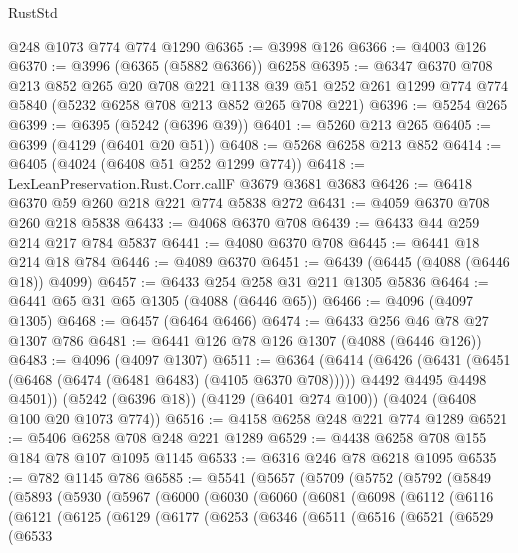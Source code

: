 \begin{lexlean}{RustStd}
\begin{coremodule}
{\begin{coremodule}
{{{{{{{{{{{{{{    @248
    @1073
    @774
    @774
    @1290
@6365 := @3998 @126
@6366 := @4003 @126
@6370 := @3996 (@6365 (@5882 @6366)) @6258
@6395 := @6347
    @6370
    @708
    @213
    @852
    @265
    @20
    @708
    @221
    @1138
    @39
    @51
    @252
    @261
    @1299
    @774
    @774
    @5840
    (@5232 @6258 @708 @213 @852 @265 @708 @221)
@6396 := @5254 @265
@6399 := @6395 (@5242 (@6396 @39))
@6401 := @5260 @213 @265
@6405 := @6399 (@4129 (@6401 @20 @51))
@6408 := @5268 @6258 @213 @852
@6414 := @6405 (@4024 (@6408 @51 @252 @1299 @774))
@6418 := LexLeanPreservation.Rust.Corr.callF @3679 @3681 @3683
@6426 := @6418 @6370 @59 @260 @218 @221 @774 @5838 @272
@6431 := @4059 @6370 @708 @260 @218 @5838
@6433 := @4068 @6370 @708
@6439 := @6433 @44 @259 @214 @217 @784 @5837
@6441 := @4080 @6370 @708
@6445 := @6441 @18 @214 @18 @784
@6446 := @4089 @6370
@6451 := @6439 (@6445 (@4088 (@6446 @18)) @4099)
@6457 := @6433 @254 @258 @31 @211 @1305 @5836
@6464 := @6441 @65 @31 @65 @1305 (@4088 (@6446 @65))
@6466 := @4096 (@4097 @1305)
@6468 := @6457 (@6464 @6466)
@6474 := @6433 @256 @46 @78 @27 @1307 @786
@6481 := @6441 @126 @78 @126 @1307 (@4088 (@6446 @126))
@6483 := @4096 (@4097 @1307)
@6511 := @6364
    (@6414
      (@6426
        (@6431 (@6451 (@6468 (@6474 (@6481 @6483) (@4105 @6370 @708)))))
        @4492
        @4495
        @4498
        @4501))
    (@5242 (@6396 @18))
    (@4129 (@6401 @274 @100))
    (@4024 (@6408 @100 @20 @1073 @774))
@6516 := @4158 @6258 @248 @221 @774 @1289
@6521 := @5406 @6258 @708 @248 @221 @1289
@6529 := @4438 @6258 @708 @155 @184 @78 @107 @1095 @1145
@6533 := @6316 @246 @78 @6218 @1095
@6535 := @782 @1145 @786
@6585 := @5541
    (@5657
      (@5709
        (@5752
          (@5792
            (@5849
              (@5893
                (@5930
                  (@5967
                    (@6000
                      (@6030
                        (@6060
                          (@6081
                            (@6098
                              (@6112
                                (@6116
                                  (@6121
                                    (@6125
                                      (@6129
                                        (@6177
                                          (@6253
                                            (@6346
                                              (@6511
                                                (@6516
                                                  (@6521
                                                    (@6529
                                                      (@6533
}}}}}}}}}}}}}}
\end{coremodule}}
\end{coremodule}
\end{lexlean}
